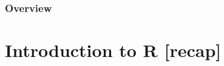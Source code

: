 \documentclass[8pt]{beamer}
\begin{document}
\begin{frame}
\frametitle{Overview}
\tableofcontents[hideallsubsections]
\end{frame}



\section{Introduction to R [recap]}

\bgroup
{}
\begin{frame}[plain]{}
\begin{center}
\color{white}{\Huge\insertsection}
\end{center}
\end{frame}
\egroup

\end{document}
